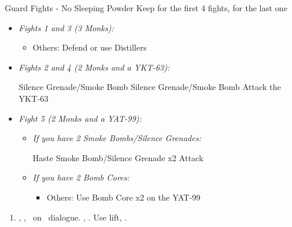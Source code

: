 \begin{battle}{Guard Fights - No Sleeping Powder}
    Keep \formation{\tidus}{\rikku}{\lulu} for the first 4 fights, \formation{\tidus}{\rikku}{\kimahri} for the last one
    \begin{itemize}
        \item \textit{Fights 1 and 3 (3 Monks):}
        \begin{itemize}
            \tidusf Attack
            \item Others: Defend or use Distillers
        \end{itemize}
        \item \textit{Fights 2 and 4 (2 Monks and a YKT-63):}
        \begin{itemize}
            \switch{\tidus}{\kimahri}
            \kimahrif Silence Grenade/Smoke Bomb
            \rikkuf Silence Grenade/Smoke Bomb
            \switch{\kimahri}{\tidus}
            \tidusf Attack the YKT-63
        \end{itemize}
        \item \textit{Fight 5 (2 Monks and a YAT-99):}
        \begin{itemize}
            \item \textit{If you have 2 Smoke Bombs/Silence Grenades:}
            \begin{itemize}
                \tidusf Haste \rikku
                \rikkuf Smoke Bomb/Silence Grenade x2
                \tidusf Attack
            \end{itemize}
            \item \textit{If you have 2 Bomb Cores:}
            \begin{itemize}
                \tidusf Attack the Monks
                \item Others: Use Bomb Core x2 on the YAT-99
            \end{itemize}
        \end{itemize}
    \end{itemize}
\end{battle}
\begin{enumerate}[resume]
    \item \sd, \skippablefmv[1:30], \sd\ on \yuna\ dialogue. \skippablefmv[30], \sd. Use lift, \sd.
\end{enumerate}
